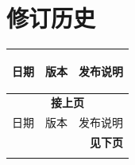 \section*{修订历史}\label{revision-history}
\rhead{\Navigation}

\begin{longtable}[l]{ | m{2cm} | m{1.5cm} | m{12cm} | }\hline

    \rowcolor{lightgray}
    日期 & 版本 & \hypertarget{Release notes}{发布说明}\\\hline
    \endfirsthead

    \multicolumn{3}{c}{\bfseries 接上页}\\\hline
    \rowcolor{lightgray}
    日期 & 版本 & 发布说明\\\hline
    \endhead

    \multicolumn{3}{r}{\textbf{见下页}}\\
    \endfoot

    \endlastfoot


\end{longtable}
